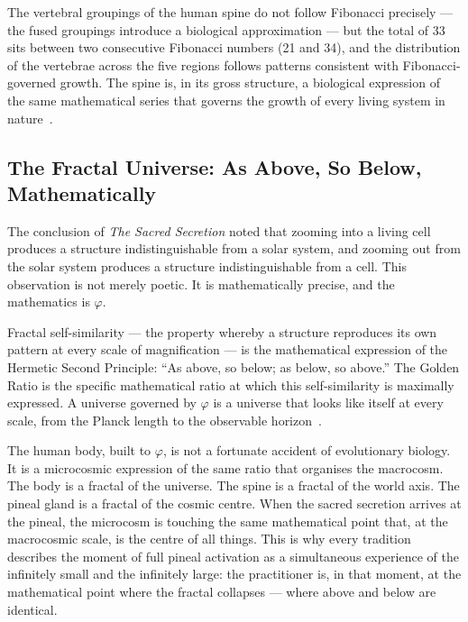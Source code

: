 \documentclass[12pt, a4paper]{article}
\begin{document}
The vertebral groupings of the human spine do not follow Fibonacci precisely —
the fused groupings introduce a biological approximation — but the total of 33
sits between two consecutive Fibonacci numbers (21 and 34), and the
distribution of the vertebrae across the five regions follows patterns
consistent with Fibonacci-governed growth. The spine is, in its gross structure,
a biological expression of the same mathematical series that governs the growth
of every living system in nature~\autocite{schneider1994}.

\subsection{The Fractal Universe: As Above, So Below, Mathematically}

The conclusion of \emph{The Sacred Secretion} noted that zooming into a living
cell produces a structure indistinguishable from a solar system, and zooming
out from the solar system produces a structure indistinguishable from a cell.
This observation is not merely poetic. It is mathematically precise, and the
mathematics is $\varphi$.

Fractal self-similarity — the property whereby a structure reproduces its own
pattern at every scale of magnification — is the mathematical expression of the
Hermetic Second Principle: ``As above, so below; as below, so above.'' The
Golden Ratio is the specific mathematical ratio at which this self-similarity
is maximally expressed. A universe governed by $\varphi$ is a universe that
looks like itself at every scale, from the Planck length to the observable
horizon~\autocite{livio2002}.

The human body, built to $\varphi$, is not a fortunate accident of evolutionary
biology. It is a microcosmic expression of the same ratio that organises the
macrocosm. The body is a fractal of the universe. The spine is a fractal of
the world axis. The pineal gland is a fractal of the cosmic centre. When the
sacred secretion arrives at the pineal, the microcosm is touching the same
mathematical point that, at the macrocosmic scale, is the centre of all things.
This is why every tradition describes the moment of full pineal activation as a
simultaneous experience of the infinitely small and the infinitely large: the
practitioner is, in that moment, at the mathematical point where the fractal
collapses — where above and below are identical.

\end{document}
